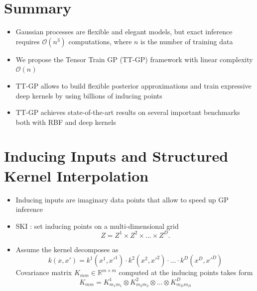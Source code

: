 \documentclass[a0,portrait]{a0poster}
\newcommand{\R}{\mathbb{R}}
\newcommand{\bigO}{\mathcal{O}}
\begin{document}
\begin{multicols}{2} %


%

\section*{\LARGE \color{NavyBlue}Summary}

\begin{itemize}
  \item Gaussian processes are flexible and elegant models, but exact inference 
    requires $\bigO(n^3)$ computations, where $n$ is the number of training data
  \item We propose the Tensor Train GP (TT-GP) framework with 
    linear complexity  $\bigO(n)$
  \item TT-GP allows to build flexible posterior approximations and train
    expressive deep kernels by using billions of inducing points
  \item TT-GP achieves state-of-the-art results on several important benchmarks
    both with RBF and deep kernels
\end{itemize}

\section*{\LARGE \color{NavyBlue}Inducing Inputs and Structured Kernel Interpolation}

\begin{itemize}
  \item Inducing inputs are imaginary data points that allow to speed up GP inference
  \item SKI \citep{wilson2015}: set inducing points on a multi-dimensional grid
    \[
      Z = Z^1 \times Z^2 \times \ldots \times Z^D.
    \]
  
  \item Assume the kernel decomposes as
    \[
      k(x, x') = k^1(x^1, x'^1) \cdot k^2(x^2, x'^2) \cdot \ldots \cdot k^D(x^D, x'^D)
    \]
    Covariance matrix $K_{mm} \in \R^{m \times m}$ computed at the
    inducing points takes form
    \[
      K_{mm} = K_{m_1 m_1}^1 \otimes K_{m_2 m_2}^2 \otimes \ldots \otimes K_{m_D m_D}^D
    \] 


\end{itemize}
\end{multicols}
\end{document}
